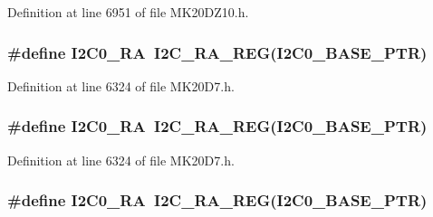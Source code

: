 Definition at line 6951 of file M\+K20\+D\+Z10.\+h.

\subsubsection[{\texorpdfstring{I2\+C0\+\_\+\+RA}{I2C0_RA}}]{\setlength{\rightskip}{0pt plus 5cm}\#define I2\+C0\+\_\+\+RA~{\bf I2\+C\+\_\+\+R\+A\+\_\+\+R\+EG}({\bf I2\+C0\+\_\+\+B\+A\+S\+E\+\_\+\+P\+TR})}\hypertarget{group___i2_c___register___accessor___macros_gaf00ad7b5cbb7776265f28c9ffc5a6acd}{}\label{group___i2_c___register___accessor___macros_gaf00ad7b5cbb7776265f28c9ffc5a6acd}


Definition at line 6324 of file M\+K20\+D7.\+h.

\subsubsection[{\texorpdfstring{I2\+C0\+\_\+\+RA}{I2C0_RA}}]{\setlength{\rightskip}{0pt plus 5cm}\#define I2\+C0\+\_\+\+RA~{\bf I2\+C\+\_\+\+R\+A\+\_\+\+R\+EG}({\bf I2\+C0\+\_\+\+B\+A\+S\+E\+\_\+\+P\+TR})}\hypertarget{group___i2_c___register___accessor___macros_gaf00ad7b5cbb7776265f28c9ffc5a6acd}{}\label{group___i2_c___register___accessor___macros_gaf00ad7b5cbb7776265f28c9ffc5a6acd}


Definition at line 6324 of file M\+K20\+D7.\+h.

\subsubsection[{\texorpdfstring{I2\+C0\+\_\+\+RA}{I2C0_RA}}]{\setlength{\rightskip}{0pt plus 5cm}\#define I2\+C0\+\_\+\+RA~{\bf I2\+C\+\_\+\+R\+A\+\_\+\+R\+EG}({\bf I2\+C0\+\_\+\+B\+A\+S\+E\+\_\+\+P\+TR})}\hypertarget{group___i2_c___register___accessor___macros_gaf00ad7b5cbb7776265f28c9ffc5a6acd}{}\label{group___i2_c___register___accessor___macros_gaf00ad7b5cbb7776265f28c9ffc5a6acd}


